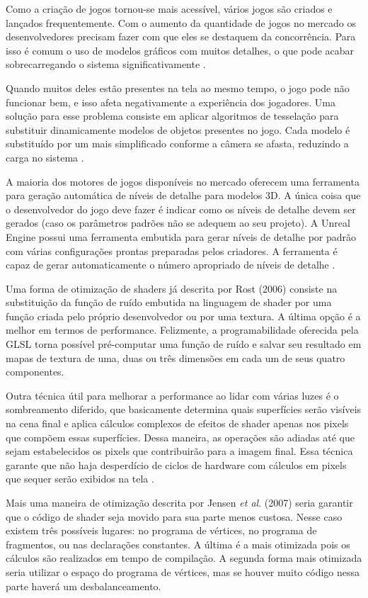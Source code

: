 Como a criação de jogos tornou-se mais acessível, vários jogos são criados e lançados frequentemente. Com o aumento da quantidade de jogos no mercado os desenvolvedores precisam fazer com que eles se destaquem da concorrência. Para isso é comum o uso de modelos gráficos com muitos detalhes, o que pode acabar sobrecarregando o sistema significativamente \cite{performanceTesselation}. 

Quando muitos deles estão presentes na tela ao mesmo tempo, o jogo pode não funcionar bem, e isso afeta negativamente a experiência dos jogadores. Uma solução para esse problema consiste em aplicar algoritmos de tesselação para substituir dinamicamente modelos de objetos presentes no jogo. Cada modelo é substituído por um mais simplificado conforme a câmera se afasta, reduzindo a carga no sistema \cite{performanceTesselation}.

A maioria dos motores de jogos disponíveis no mercado oferecem uma ferramenta para geração automática de níveis de detalhe para modelos 3D. A única coisa que o desenvolvedor do jogo deve fazer é indicar como os níveis de detalhe devem ser gerados (caso os parâmetros padrões não se adequem ao seu projeto). A Unreal Engine possui uma ferramenta embutida para gerar níveis de detalhe por padrão com várias configurações prontas preparadas pelos criadores. A ferramenta é capaz de gerar automaticamente o número apropriado de níveis de detalhe \cite{performanceTesselation}.

Uma forma de otimização de shaders já descrita por Rost (2006) consiste na substituição da função de ruído embutida na linguagem de shader por uma função criada pelo próprio desenvolvedor ou por uma textura. A última opção é a melhor em termos de performance. Felizmente, a programabilidade oferecida pela GLSL torna possível pré-computar uma função de ruído e salvar seu resultado em mapas de textura de uma, duas ou três dimensões em cada um de seus quatro componentes.

Outra técnica útil para melhorar a performance ao lidar com várias luzes é o sombreamento diferido, que basicamente determina quais superfícies serão visíveis na cena final e aplica cálculos complexos de efeitos de shader apenas nos pixels que compõem essas superfícies. Dessa maneira, as operações são adiadas até que sejam estabelecidos os pixels que contribuirão para a imagem final. Essa técnica garante que não haja desperdício de ciclos de hardware com cálculos em pixels que sequer serão exibidos na tela \cite{GLSLBook}.

Mais uma maneira de otimização descrita por Jensen \textit{et al}. (2007) seria garantir que o código de shader seja movido para sua parte menos custosa. Nesse caso existem três possíveis lugares: no programa de vértices, no programa de fragmentos, ou nas declarações constantes. A última é a mais otimizada pois os cálculos são realizados em tempo de compilação. A segunda forma mais otimizada seria utilizar o espaço do programa de vértices, mas se houver muito código nessa parte haverá um desbalanceamento.

